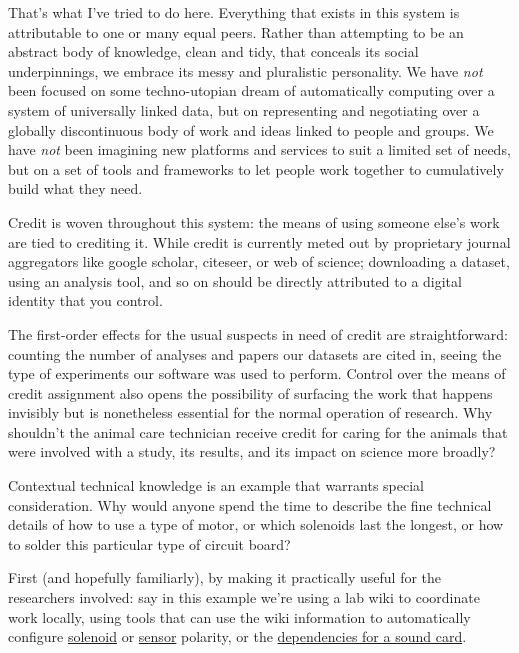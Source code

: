 \documentclass[10pt]{article}
\begin{document}
\begin{multicols}{2}
That's what I've tried to do here. Everything that exists in this system
is attributable to one or many equal peers. Rather than attempting to be
an abstract body of knowledge, clean and tidy, that conceals its social
underpinnings, we embrace its messy and pluralistic personality. We have
\emph{not} been focused on some techno-utopian dream of automatically
computing over a system of universally linked data, but on representing
and negotiating over a globally discontinuous body of work and ideas
linked to people and groups. We have \emph{not} been imagining new
platforms and services to suit a limited set of needs, but on a set of
tools and frameworks to let people work together to cumulatively build
what they need.

Credit is woven throughout this system: the means of using someone
else's work are tied to crediting it. While credit is currently meted
out by proprietary journal aggregators like google scholar, citeseer, or
web of science; downloading a dataset, using an analysis tool, and so on
should be directly attributed to a digital identity that you control.

The first-order effects for the usual suspects in need of credit are
straightforward: counting the number of analyses and papers our datasets
are cited in, seeing the type of experiments our software was used to
perform. Control over the means of credit assignment also opens the
possibility of surfacing the work that happens invisibly but is
nonetheless essential for the normal operation of research. Why
shouldn't the animal care technician receive credit for caring for the
animals that were involved with a study, its results, and its impact on
science more broadly?

Contextual technical knowledge is an example that warrants special
consideration. Why would anyone spend the time to describe the fine
technical details of how to use a type of motor, or which solenoids last
the longest, or how to solder this particular type of circuit board?

First (and hopefully familiarly), by making it practically useful for
the researchers involved: say in this example we're using a lab wiki to
coordinate work locally, using tools that can use the wiki information
to automatically configure
\href{https://wiki.auto-pi-lot.com/index.php/Lee_LHDA0531115H}{solenoid}
or
\href{https://wiki.auto-pi-lot.com/index.php/TT_Electronics_OPB903L55}{sensor}
polarity, or the
\href{https://wiki.auto-pi-lot.com/index.php/HiFiBerry_Amp2}{dependencies
for a sound card}.


\end{multicols}
\end{document}
